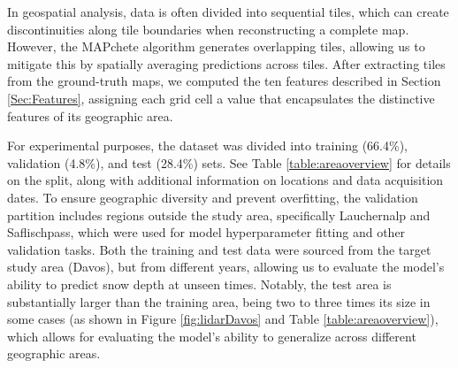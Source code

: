 \documentclass[preprint,12pt]{elsarticle}
\begin{document}
In geospatial analysis, data is often divided into sequential tiles, which can create discontinuities along tile boundaries when reconstructing a complete map. However, the MAPchete algorithm generates overlapping tiles, allowing us to mitigate this by spatially averaging predictions across tiles. %
After extracting tiles from the ground-truth maps, we computed the ten features described in Section \ref{Sec:Features}, assigning each grid cell a value that encapsulates the distinctive features of its geographic area. 

For experimental purposes, the dataset was divided into training (66.4\%), validation (4.8\%), and test (28.4\%) sets. See Table \ref{table:areaoverview} for details on the split, along with additional information on locations and data acquisition dates.  To ensure geographic diversity and prevent overfitting, the validation partition includes regions outside the study area, specifically Lauchernalp and Saflischpass, which were used for model hyperparameter fitting and other validation tasks. Both the training and test data were sourced from the target study area (Davos), but from different years, allowing us to evaluate the model's ability to predict snow depth at unseen times. Notably, the test area is substantially larger than the training area, being two to three times its size in some cases (as shown in Figure \ref{fig:lidarDavos} and Table \ref{table:areaoverview}), which allows for evaluating the model's ability to generalize across different geographic areas.
\end{document}
